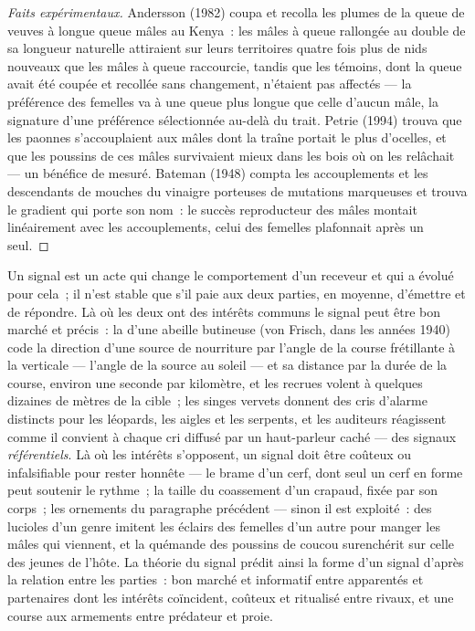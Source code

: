 \begin{proof}[Faits expérimentaux]
Andersson (1982) coupa et recolla les plumes de la queue de veuves à
longue queue mâles au Kenya~: les mâles à queue rallongée au double de
sa longueur naturelle attiraient sur leurs territoires quatre fois plus
de nids nouveaux que les mâles à queue raccourcie, tandis que les
témoins, dont la queue avait été coupée et recollée sans changement,
n'étaient pas affectés --- la préférence des femelles va à une queue
plus longue que celle d'aucun mâle, la signature d'une préférence
sélectionnée au-delà du trait. Petrie (1994) trouva que les paonnes
s'accouplaient aux mâles dont la traîne portait le plus d'ocelles, et
que les poussins de ces mâles survivaient mieux dans les bois où on les
relâchait --- un bénéfice de  mesuré. Bateman (1948) compta
les accouplements et les descendants de mouches du vinaigre porteuses
de mutations marqueuses et trouva le gradient qui porte son nom~: le
succès reproducteur des mâles montait linéairement avec les
accouplements, celui des femelles plafonnait après un seul.
\end{proof}

\begin{proposition}\label{prop:b3:behavioural-ecology:signals}
Un signal est un acte qui change le comportement d'un receveur et qui a
évolué pour cela~; il n'est stable que s'il paie aux deux parties, en
moyenne, d'émettre et de répondre. Là où les deux ont des intérêts
communs le signal peut être bon marché et précis~: la \emph{} d'une abeille butineuse (von Frisch, dans les années 1940)
code la direction d'une source de nourriture par l'angle de la course
frétillante à la verticale --- l'angle de la source au soleil --- et sa
distance par la durée de la course, environ une seconde par kilomètre,
et les recrues volent à quelques dizaines de mètres de la cible~; les
singes vervets donnent des cris d'alarme distincts pour les léopards,
les aigles et les serpents, et les auditeurs réagissent comme il
convient à chaque cri diffusé par un haut-parleur caché --- des signaux
\emph{référentiels}. Là où les intérêts s'opposent, un signal doit être
coûteux ou infalsifiable pour rester honnête --- le brame d'un cerf,
dont seul un cerf en forme peut soutenir le rythme~; la taille du coassement
d'un crapaud, fixée par son corps~; les ornements du paragraphe
précédent --- sinon il est exploité~: des lucioles d'un genre imitent
les éclairs des femelles d'un autre pour manger les mâles qui viennent,
et la quémande des poussins de coucou surenchérit sur celle des jeunes
de l'hôte. La théorie du signal prédit ainsi la forme d'un signal
d'après la relation entre les parties~: bon marché et informatif entre
apparentés et partenaires dont les intérêts coïncident, coûteux et
ritualisé entre rivaux, et une course aux armements entre prédateur et
proie.
\end{proposition}
\admitted


